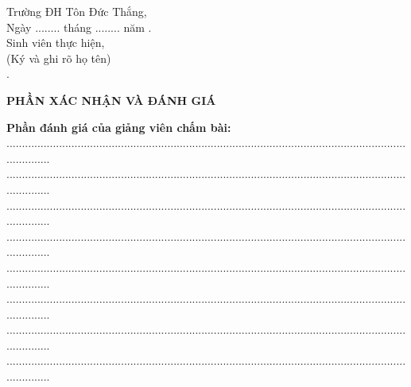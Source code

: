 \begin{center}
	\hspace*{7cm}Trường ĐH Tôn Đức Thắng,\\
	\hspace*{7cm}Ngày ........ tháng ........ năm \nam.\\
	\hspace*{7cm}Sinh viên thực hiện,\\
	\hspace*{7cm}(Ký và ghi rõ họ tên)\\
	\vspace*{0.2cm}
	\vspace*{2cm}
	\hspace*{7cm}\tacgia.
\end{center}		
	\newpage
\begin{center}
	\Large{\textbf{PHẦN XÁC NHẬN VÀ ĐÁNH GIÁ}}
\end{center}
	\textbf{Phần đánh giá của giảng viên chấm bài:}\\
	...............................................................................................................................................\\
	...............................................................................................................................................\\
	...............................................................................................................................................\\
	...............................................................................................................................................\\
	...............................................................................................................................................\\
	...............................................................................................................................................\\
	...............................................................................................................................................\\
	...............................................................................................................................................\\
